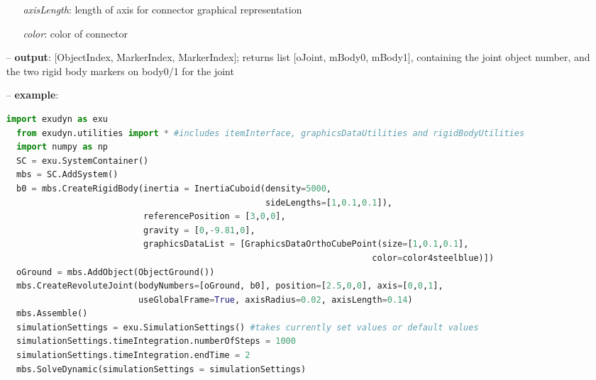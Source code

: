 \begin{itemize}[leftmargin=0.7cm]
\begin{itemize}[leftmargin=1.2cm]
\item[]{\it axisLength}: length of axis for connector graphical representation
\item[]{\it color}: color of connector
\end{itemize}
\item[--]
{\bf output}: [ObjectIndex, MarkerIndex, MarkerIndex]; returns list [oJoint, mBody0, mBody1], containing the joint object number, and the two rigid body markers on body0/1 for the joint
\item[--]
{\bf example}: \vspace{-12pt}\ei\begin{lstlisting}[language=Python, xleftmargin=36pt]
  import exudyn as exu
  from exudyn.utilities import * #includes itemInterface, graphicsDataUtilities and rigidBodyUtilities
  import numpy as np
  SC = exu.SystemContainer()
  mbs = SC.AddSystem()
  b0 = mbs.CreateRigidBody(inertia = InertiaCuboid(density=5000,
                                                   sideLengths=[1,0.1,0.1]),
                           referencePosition = [3,0,0],
                           gravity = [0,-9.81,0],
                           graphicsDataList = [GraphicsDataOrthoCubePoint(size=[1,0.1,0.1],
                                                                        color=color4steelblue)])
  oGround = mbs.AddObject(ObjectGround())
  mbs.CreateRevoluteJoint(bodyNumbers=[oGround, b0], position=[2.5,0,0], axis=[0,0,1],
                          useGlobalFrame=True, axisRadius=0.02, axisLength=0.14)
  mbs.Assemble()
  simulationSettings = exu.SimulationSettings() #takes currently set values or default values
  simulationSettings.timeIntegration.numberOfSteps = 1000
  simulationSettings.timeIntegration.endTime = 2
  mbs.SolveDynamic(simulationSettings = simulationSettings)
\end{lstlisting}\vspace{-24pt}\bi\item[]\vspace{-24pt}\vspace{12pt}\end{itemize}
%

